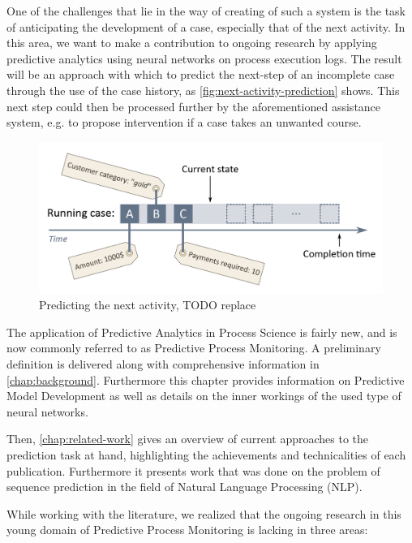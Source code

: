 One of the challenges that lie in the way of creating of such a system is the task of anticipating the development of a case, especially that of the next activity. In this area, we want to make a contribution to ongoing research by applying predictive analytics using neural networks on process execution logs. The result will be an approach with which to predict the next-step of an incomplete case through the use of the case history, as \autoref{fig:next-activity-prediction} shows. This next step could then be processed further by the aforementioned assistance system, e.g. to propose intervention if a case takes an unwanted course.\\

\begin{figure}
    \centering
    \includegraphics[width=\textwidth]{gfx/next-activity.png}
    \caption{Predicting the next activity, TODO replace}
    \label{fig:next-activity-prediction}
\end{figure}

The application of Predictive Analytics in Process Science is fairly new, and is now commonly referred to as Predictive Process Monitoring. A preliminary definition is delivered along with comprehensive information in \autoref{chap:background}. Furthermore this chapter provides information on Predictive Model Development as well as details on the inner workings of the used type of neural networks.

Then, \autoref{chap:related-work} gives an overview of current approaches to the prediction task at hand, highlighting the achievements and technicalities of each publication. Furthermore it presents work that was done on the problem of sequence prediction in the field of Natural Language Processing (NLP).

While working with the literature, we realized that the ongoing research in this young domain of Predictive Process Monitoring is lacking in three areas:

